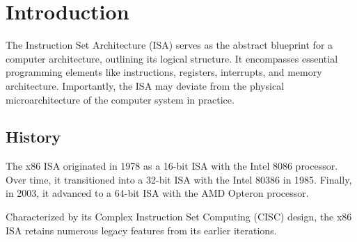 \section{Introduction}

The Instruction Set Architecture (ISA) serves as the abstract blueprint for a computer architecture, outlining its logical structure. 
It encompasses essential programming elements like instructions, registers, interrupts, and memory architecture. 
Importantly, the ISA may deviate from the physical microarchitecture of the computer system in practice.

\subsection{History}
The x86 ISA originated in 1978 as a 16-bit ISA with the Intel 8086 processor. 
Over time, it transitioned into a 32-bit ISA with the Intel 80386 in 1985. 
Finally, in 2003, it advanced to a 64-bit ISA with the AMD Opteron processor.

Characterized by its Complex Instruction Set Computing (CISC) design, the x86 ISA retains numerous legacy features from its earlier iterations.

